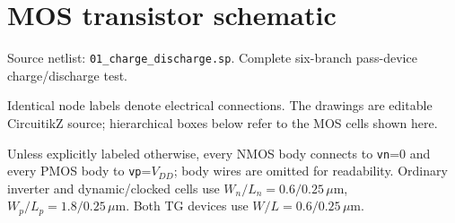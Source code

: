 \clearpage\section{MOS transistor schematic}
\begingroup\small
Source netlist: \texttt{01\_charge\_discharge.sp}. Complete six-branch pass-device charge/discharge test.

Identical node labels denote electrical connections. The drawings are editable CircuitikZ source; hierarchical boxes below refer to the MOS cells shown here.

Unless explicitly labeled otherwise, every NMOS body connects to \texttt{vn}=0 and every PMOS body to \texttt{vp}=\(V_{DD}\); body wires are omitted for readability. Ordinary inverter and dynamic/clocked cells use \(W_n/L_n=0.6/0.25\,\mu\mathrm m\), \(W_p/L_p=1.8/0.25\,\mu\mathrm m\). Both TG devices use \(W/L=0.6/0.25\,\mu\mathrm m\). 

